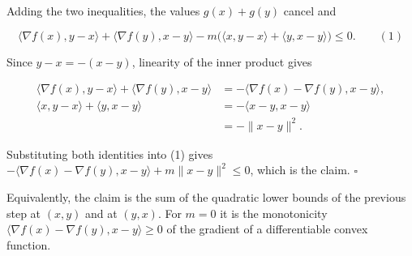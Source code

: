 \documentclass[11pt,a4paper]{article}
\begin{document}
Adding the two inequalities, the values \(g(x)+g(y)\) cancel and


\[\langle\nabla f(x),y-x\rangle+\langle\nabla f(y),x-y\rangle-m\bigl(\langle x,y-x\rangle+\langle y,x-y\rangle\bigr)\le0.\qquad(1)\]


Since \(y-x=-(x-y)\), linearity of the inner product gives


\[\begin{aligned}\langle\nabla f(x),y-x\rangle+\langle\nabla f(y),x-y\rangle&=-\langle\nabla f(x)-\nabla f(y),x-y\rangle,\\\langle x,y-x\rangle+\langle y,x-y\rangle&=-\langle x-y,x-y\rangle\\&=-\|x-y\|^2.\end{aligned}\]


Substituting both identities into (1) gives \(-\langle\nabla f(x)-\nabla f(y),x-y\rangle+m\|x-y\|^2\le0\), which is the claim. \(\square\)




Equivalently, the claim is the sum of the quadratic lower bounds of the previous step at \((x,y)\) and at \((y,x)\). For \(m=0\) it is the monotonicity \(\langle\nabla f(x)-\nabla f(y),x-y\rangle\ge0\) of the gradient of a differentiable convex function.
\end{document}
